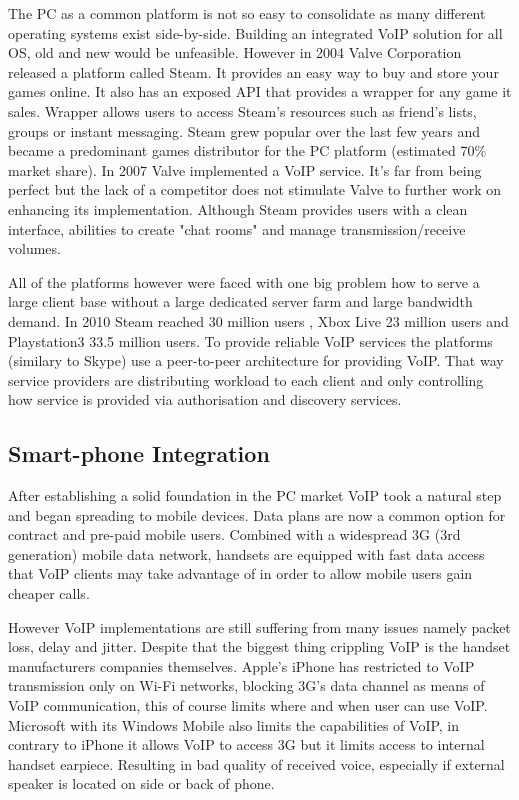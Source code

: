 The PC as a common platform is not so easy to consolidate as many different operating systems exist side-by-side. Building an integrated VoIP solution for all OS, old and new would be unfeasible. However in 2004 Valve Corporation released a platform called Steam. It provides an easy way to buy and store your games online. It also has an exposed API that provides a wrapper for any game it sales. Wrapper allows users to access Steam's resources such as friend's lists, groups or instant messaging. Steam grew popular over the last few years and became a predominant games distributor for the PC platform (estimated 70\% market share\cite{steam_market_share}). In 2007 Valve implemented a VoIP service. It's far from being perfect but the lack of a competitor does not stimulate Valve to further work on enhancing its implementation. Although Steam provides users with a clean interface, abilities to create "chat rooms" and manage transmission/receive volumes.

All of the platforms however were faced with one big problem how to serve a large client base without a large dedicated server farm and large bandwidth demand. In 2010 Steam reached 30 million users \cite{website:steam_growth}, Xbox Live 23 million users\cite{xbox_live_market} and Playstation3 33.5 million users\cite{website:ps3_marketshare}. To provide reliable VoIP services the platforms (similary to Skype) use a peer-to-peer architecture for providing VoIP. That way service providers are distributing workload to each client and only controlling how service is provided via authorisation and discovery services.

\subsection{Smart-phone Integration}

After establishing a solid foundation in the PC market VoIP took a natural step and began spreading to mobile devices. Data plans are now a common option for contract and pre-paid mobile users. Combined with a widespread 3G (3rd generation) mobile data network, handsets are equipped with fast data access that VoIP clients may take advantage of in order to allow mobile users gain cheaper calls.

However VoIP implementations are still suffering from many issues namely packet loss, delay and jitter. Despite that the biggest thing crippling VoIP is the handset manufacturers companies themselves. Apple's iPhone has restricted to VoIP transmission only on Wi-Fi networks, blocking 3G's data channel as means of VoIP communication, this of course limits where and when user can use VoIP. Microsoft with its Windows Mobile also limits the capabilities of VoIP, in contrary to iPhone it allows VoIP to access 3G but it limits access to internal handset earpiece. Resulting in bad quality of received voice, especially if external speaker is located on side or back of phone\cite{website:voip_cripling_by_apple}.

